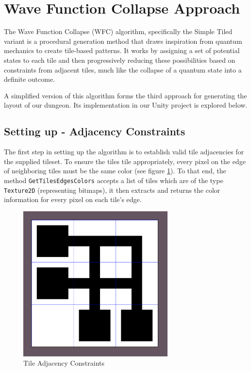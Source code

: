 \documentclass[a4paper, 12pt, one column, aas_macros]{article}
\begin{document}
\section{Wave Function Collapse Approach}
The Wave Function Collapse (WFC) algorithm, specifically the Simple Tiled variant is a procedural generation method that draws inspiration from quantum mechanics to create tile-based patterns. It works by assigning a set of potential states to each tile and then progressively reducing these possibilities based on constraints from adjacent tiles, much like the collapse of a quantum state into a definite outcome. 

A simplified version of this algorithm forms the third approach for generating the layout of our dungeon. Its implementation in our Unity project is explored below.

\subsection{Setting up - Adjacency Constraints}
The first step in setting up the algorithm is to establish valid tile adjacencies for the supplied tileset. To ensure the tiles tile appropriately, every pixel on the edge of neighboring tiles must be the same color (see figure \ref{fig:wfc-tile-adjacency-constraints}). To that end, the method \texttt{GetTilesEdgesColors} accepts a list of tiles which are of the type \texttt{Texture2D} (representing bitmaps), it then extracts and returns the color information for every pixel on each tile's edge.

\begin{figure}[htbp]
  \centering
  \includegraphics[width=0.7\textwidth]{images/wfc-tile-adjacency-constraints.png}
  \caption{Tile Adjacency Constraints}
  \label{fig:wfc-tile-adjacency-constraints}
\end{figure}
\end{document}
